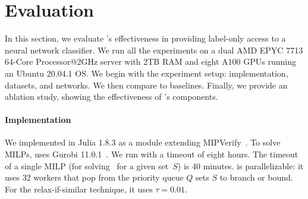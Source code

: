 \section{Evaluation}
\label{sec:eval}

In this section, we evaluate \tool's effectiveness in providing \propi label-only access to a neural network classifier. %
We run all the experiments on a dual AMD EPYC 7713 64-Core Processor@2GHz server with 2TB RAM and eight A100 GPUs running an Ubuntu 20.04.1 OS. 
We begin with the experiment setup: implementation, datasets, and networks. %
We then compare \tool to baselines. Finally, we provide an ablation study, showing the effectiveness of \tool's components. %
\paragraph{Implementation} 
We implemented \tool in Julia 1.8.3 as a module extending MIPVerify~\cite{ref_42}.
To solve MILPs, \tool uses Gurobi 11.0.1~\cite{gurobi}.  
We run \tool with a timeout of eight hours. The timeout of a single MILP (for solving~ for a given set~$S$) is 40 minutes. \tool is parallelizable: it uses 32 workers that pop from the priority queue $Q$ sets $S$ to branch or bound. For the relax-if-similar technique, it uses $\tau=0.01$. 
\begin{comment}
\begin{enumerate}[nosep,nolistsep]
    \item Coin Toss: returning a random label drawn from a Bernoulli distribution with $p=1/2$ (since our experiments are over binary classifiers). %
        This noise function provides a perfect DP guarantee, i.e., a $(0,0)$-DP guarantee.
    \item Gaussian: adds a Gaussian noise to the network's probabilities, obtained by passing the network's output through softmax. The noise is drawn from a Gaussian distribution with standard deviation $\sigma = \sqrt{2 \cdot \ln\left({1.25}/ {\delta}\right)} \cdot {1}/{\varepsilon}$. This noise function provides a ($\varepsilon$, $\delta$)-DP guarantee, where we set $\delta=10^{-5}$ (as common) and $\varepsilon$ varies in our experiments.
\end{enumerate}
\end{comment}


